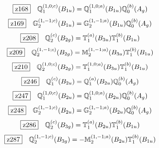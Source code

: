 \documentclass[fleqn,10pt,landscape]{jsarticle}
\begin{document}
\begin{dmath*}
\hspace*{3mm}\fbox{z168}\quad \mathbb{Q}_{1}^{(1,0;c)}(B_{1u})=\mathbb{Q}_{1}^{(1,0;a)}(B_{1u}) \mathbb{Q}_{0}^{(b)}(A_{g})
\end{dmath*}
\begin{dmath*}
\hspace*{3mm}\fbox{z169}\quad \mathbb{G}_{2}^{(1,-1;c)}(B_{1u})=\mathbb{G}_{2}^{(1,-1;a)}(B_{1u}) \mathbb{Q}_{0}^{(b)}(A_{g})
\end{dmath*}
\begin{dmath*}
\hspace*{3mm}\fbox{z208}\quad \mathbb{Q}_{2}^{(c)}(B_{2g})=\mathbb{T}_{1}^{(a)}(B_{3u}) \mathbb{T}_{1}^{(b)}(B_{1u})
\end{dmath*}
\begin{dmath*}
\hspace*{3mm}\fbox{z209}\quad \mathbb{Q}_{2}^{(1,-1;c)}(B_{2g})=\mathbb{M}_{2}^{(1,-1;a)}(B_{3u}) \mathbb{T}_{1}^{(b)}(B_{1u})
\end{dmath*}
\begin{dmath*}
\hspace*{3mm}\fbox{z210}\quad \mathbb{Q}_{2}^{(1,0;c)}(B_{2g})=\mathbb{T}_{1}^{(1,0;a)}(B_{3u}) \mathbb{T}_{1}^{(b)}(B_{1u})
\end{dmath*}
\begin{dmath*}
\hspace*{3mm}\fbox{z246}\quad \mathbb{Q}_{1}^{(c)}(B_{2u})=\mathbb{Q}_{1}^{(a)}(B_{2u}) \mathbb{Q}_{0}^{(b)}(A_{g})
\end{dmath*}
\begin{dmath*}
\hspace*{3mm}\fbox{z247}\quad \mathbb{Q}_{1}^{(1,0;c)}(B_{2u})=\mathbb{Q}_{1}^{(1,0;a)}(B_{2u}) \mathbb{Q}_{0}^{(b)}(A_{g})
\end{dmath*}
\begin{dmath*}
\hspace*{3mm}\fbox{z248}\quad \mathbb{G}_{2}^{(1,-1;c)}(B_{2u})=\mathbb{G}_{2}^{(1,-1;a)}(B_{2u}) \mathbb{Q}_{0}^{(b)}(A_{g})
\end{dmath*}
\begin{dmath*}
\hspace*{3mm}\fbox{z286}\quad \mathbb{Q}_{2}^{(c)}(B_{3g})=\mathbb{T}_{1}^{(a)}(B_{2u}) \mathbb{T}_{1}^{(b)}(B_{1u})
\end{dmath*}
\begin{dmath*}
\hspace*{3mm}\fbox{z287}\quad \mathbb{Q}_{2}^{(1,-1;c)}(B_{3g})=- \mathbb{M}_{2}^{(1,-1;a)}(B_{2u}) \mathbb{T}_{1}^{(b)}(B_{1u})
\end{dmath*}
\end{document}
